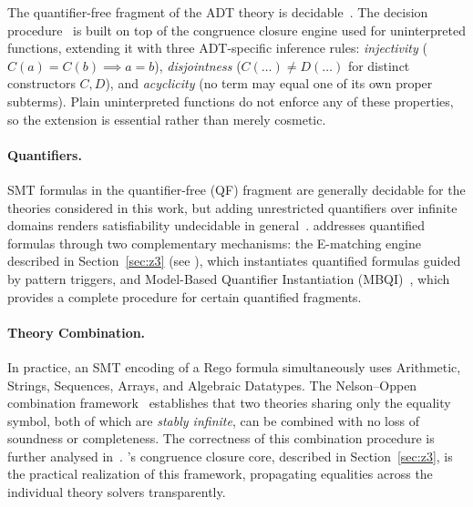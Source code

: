 The quantifier-free fragment of the ADT theory is decidable~\cite{smt:adt-oppen}.
The decision procedure~\cite{smt:adt-decision} is built on top of the congruence
closure engine used for uninterpreted functions, extending it with three
ADT-specific inference rules: \emph{injectivity} ($C(a) = C(b) \implies a = b$),
\emph{disjointness} ($C(\ldots) \neq D(\ldots)$ for distinct constructors $C, D$),
and \emph{acyclicity} (no term may equal one of its own proper subterms).
Plain uninterpreted functions do not enforce any of these properties, so the
extension is essential rather than merely cosmetic.

\paragraph{Quantifiers.}
SMT formulas in the quantifier-free (QF) fragment are generally decidable for the
theories considered in this work, but adding unrestricted quantifiers over infinite
domains renders satisfiability undecidable in general~\cite{smt:mbqi}.
\ziii addresses quantified formulas through two complementary mechanisms: the
E-matching engine described in Section~\ref{sec:z3} (see \cite{z3:e-match}), which
instantiates quantified formulas guided by pattern triggers, and Model-Based
Quantifier Instantiation (MBQI)~\cite{smt:mbqi}, which provides a complete
procedure for certain quantified fragments.

\paragraph{Theory Combination.}
In practice, an SMT encoding of a Rego formula simultaneously uses Arithmetic,
Strings, Sequences, Arrays, and Algebraic Datatypes.
The Nelson--Oppen combination framework~\cite{smt:nelson-oppen} establishes that
two theories sharing only the equality symbol, both of which are
\emph{stably infinite}, can be combined with no loss of soundness or completeness.
The correctness of this combination procedure is further analysed
in~\cite{smt:tinelli-harandi}.
\ziii's congruence closure core, described in Section~\ref{sec:z3}, is the practical
realization of this framework, propagating equalities across the individual theory
solvers transparently.
